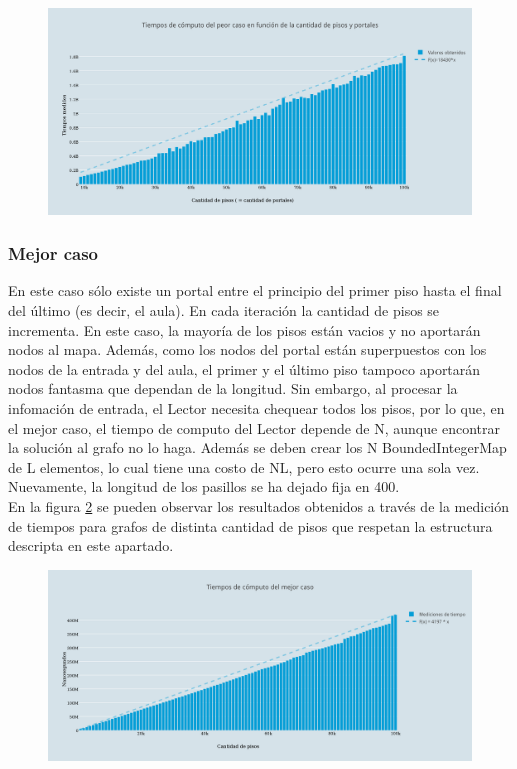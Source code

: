 \begin{figure}[H]
   \begin{center}
 	\includegraphics[width=18cm]{imagenes/ej2/peorCaso.png}
	\label{peorCaso}
   \end{center}
 \end{figure}


\subsubsection{Mejor caso}
En este caso sólo existe un portal entre el principio del primer piso hasta el final del último (es decir, el aula). En cada iteración la cantidad de pisos se incrementa. En este caso, la mayoría de los pisos están vacios y no aportarán nodos al mapa. Además, como los nodos del portal están superpuestos con los nodos de la entrada y del aula, el primer y el último piso tampoco aportarán nodos fantasma que dependan de la longitud. Sin embargo, al procesar la infomación de entrada, el Lector necesita chequear todos los pisos, por lo que, en el mejor caso, el tiempo de computo del Lector depende de N, aunque encontrar la solución al grafo no lo haga. Además se deben crear los N BoundedIntegerMap de L elementos, lo cual tiene una costo de NL, pero esto ocurre una sola vez. Nuevamente, la longitud de los pasillos se ha dejado fija en 400.\\
En la figura \ref{mejorCaso} se pueden observar los resultados obtenidos a través de la medición de tiempos para grafos de distinta cantidad de pisos que respetan la estructura descripta en este apartado.

\begin{figure}[H]
   \begin{center}
 	\includegraphics[width=18cm]{imagenes/ej2/mejorCaso.png}
	\label{mejorCaso}
   \end{center}
 \end{figure}
 
